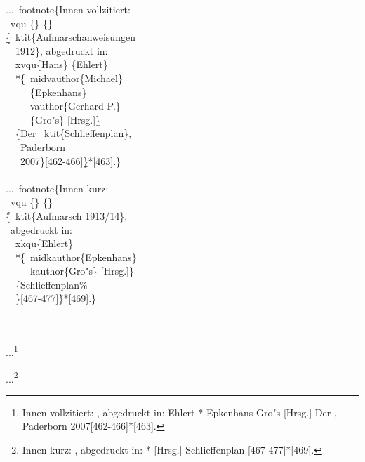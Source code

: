 \documentclass[12pt,a4paper]{article}
\newcommand{\pbs}{\string\ \unskip}
\newcommand{\bs}{\protect\pbs}
\begin{document}
\vspace{.75ex}
\Doppelbox
{...\bs footnote\{Innen vollzitiert: 
 \\ \bs vqu \{\} \{\} 
 \\ \b{\b{\{}}\bs ktit\{Aufmarschanweisungen 
 \\ \ \ 1912\}, abgedruckt in: 
 \\ \ \bs xvqu\{Hans\} \{Ehlert\} 
 \\{} \ \ *\b{\{}\bs midvauthor\{Michael\}
 \\ \ \ \ \ \ \{Epkenhans\} 
 \\ \ \ \ \ \bs vauthor\{Gerhard P.\} 
 \\ \ \ \ \ \ \{Gro"s\} [Hrsg.]\b{\}} 
 \\ \ \ \{Der \bs ktit\{Schlieffenplan\},
 \\ \ \ \ Paderborn 
 \\ \ \ \ 2007\}[462-466]\b{\b{\}}}*[463].\}
 \\ \
 \\ ...\bs footnote\{Innen kurz: 
 \\ \bs vqu \{\} \{\} 
 \\ \H{\{}\bs ktit\{Aufmarsch 1913/14\},
 \\ \ abgedruckt in: 
 \\ \ \bs xkqu\{Ehlert\}
 \\{}\ \ *\{\bs midkauthor\{Epkenhans\} 
 \\ \ \ \ \ \bs kauthor\{Gro"s\} [Hrsg.]\}
 \\ \ \ \{Schlieffenplan\%
 \\ \ \ \}[467-477]\H{\}}*[469].\} 
}
{\vspace{1ex}
 \\
 \\[1ex] ...\footnote{Innen vollzitiert: \vqu {} {} 
   {, 
   abgedruckt in:  {Ehlert}
   *{ {Epkenhans}
      {Gro"s} [Hrsg.]} 
                {Der ,
     Paderborn 2007}[462-466]}*[463].}
                
 ...\footnote{Innen kurz: \vqu {} {} 
    {,
    abgedruckt in: 
    *{  [Hrsg.]}
    {Schlieffenplan%
      }[467-477]}*[469].}
}
\end{document}

